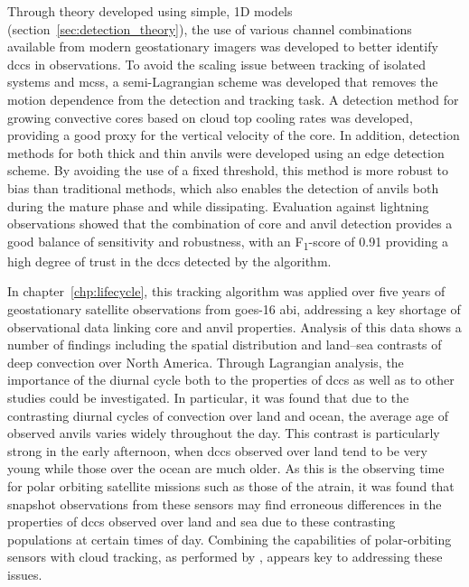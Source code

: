 Through theory developed using simple, 1D models (section~\ref{sec:detection_theory}), the use of various channel combinations available from modern geostationary imagers was developed to better identify \acrshort{dcc}s in observations.
To avoid the scaling issue between tracking of isolated systems and \acrshort{mcs}s, a semi-Lagrangian scheme was developed that removes the motion dependence from the detection and tracking task.
A detection method for growing convective cores based on cloud top cooling rates was developed, providing a good proxy for the vertical velocity of the core.
In addition, detection methods for both thick and thin anvils were developed using an edge detection scheme.
By avoiding the use of a fixed threshold, this method is more robust to bias than traditional methods, which also enables the detection of anvils both during the mature phase and while dissipating.
Evaluation against lightning observations showed that the combination of core and anvil detection provides a good balance of sensitivity and robustness,  with an F\textsubscript{1}-score of 0.91 providing a high degree of trust in the \acrshort{dcc}s detected by the algorithm.

In chapter~\ref{chp:lifecycle}, this tracking algorithm was applied over five years of geostationary satellite observations from \acrshort{goes}-16 \acrshort{abi}, addressing a key shortage of observational data linking core and anvil properties.
Analysis of this data shows a number of findings including the spatial distribution and land--sea contrasts of deep convection over North America.
Through Lagrangian analysis, the importance of the diurnal cycle both to the properties of \acrshort{dcc}s as well as to other studies could be investigated.
In particular, it was found that due to the contrasting diurnal cycles of convection over land and ocean, the average age of observed anvils varies widely throughout the day.
This contrast is particularly strong in the early afternoon, when \acrshort{dcc}s observed over land tend to be very young while those over the ocean are much older.
As this is the observing time for polar orbiting satellite missions such as those of the \acrshort{atrain}, it was found that snapshot observations from these sensors may find erroneous differences in the properties of \acrshort{dcc}s observed over land and sea due to these contrasting populations at certain times of day.
Combining the capabilities of polar-orbiting sensors with cloud tracking, as performed by \citet{elsaesser_simple_2022}, appears key to addressing these issues.

